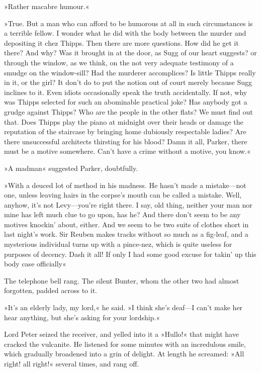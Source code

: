 »Rather macabre humour.«

»True. But a man who can afford to be humorous at all in such circumstances is a terrible fellow. I wonder what he did with the body between the murder and depositing it chez Thipps. Then there are more questions. How did he get it there? And why? Was it brought in at the door, as Sugg of our heart suggests? or through the window, as we think, on the not very adequate testimony of a smudge on the window-sill? Had the murderer accomplices? Is little Thipps really in it, or the girl? It don't do to put the notion out of court merely because Sugg inclines to it. Even idiots occasionally speak the truth accidentally. If not, why was Thipps selected for such an abominable practical joke? Has anybody got a grudge against Thipps? Who are the people in the other flats? We must find out that. Does Thipps play the piano at midnight over their heads or damage the reputation of the staircase by bringing home dubiously respectable ladies? Are there unsuccessful architects thirsting for his blood? Damn it all, Parker, there must be a motive somewhere. Can't have a crime without a motive, you know.«

»A madman\longdash« suggested Parker, doubtfully.

»With a deuced lot of method in his madness. He hasn't made a mistake\allowbreak---\allowbreak not one, unless leaving hairs in the corpse's mouth can be called a mistake. Well, anyhow, it's not Levy\allowbreak---\allowbreak you're right there. I say, old thing, neither your man nor mine has left much clue to go upon, has he? And there don't seem to be any motives knockin' about, either. And we seem to be two suits of clothes short in last night's work. Sir Reuben makes tracks without so much as a fig-leaf, and a mysterious individual turns up with a pince-nez, which is quite useless for purposes of decency. Dash it all! If only I had some good excuse for takin' up this body case officially\longdash«

The telephone bell rang. The silent Bunter, whom the other two had almost forgotten, padded across to it.

»It's an elderly lady, my lord,« he said. »I think she's deaf\allowbreak---\allowbreak I can't make her hear anything, but she's asking for your lordship.«

Lord Peter seized the receiver, and yelled into it a »Hullo!« that might have cracked the vulcanite. He listened for some minutes with an incredulous smile, which gradually broadened into a grin of delight. At length he screamed: »All right! all right!« several times, and rang off.

